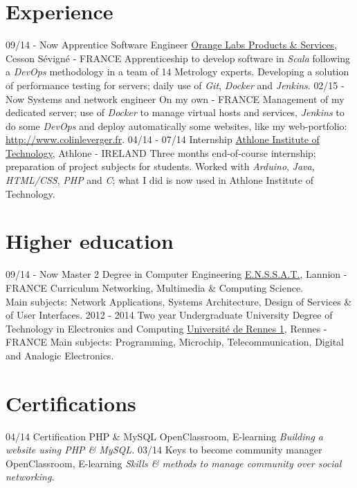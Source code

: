 \documentclass[]{friggeri-cv}
\begin{document}
\section{Experience}
\begin{entrylist}
  \entry
    {09/14 - Now}
    {Apprentice Software Engineer}
    {\href{http://www.orange.com/en/home}{Orange Labs Products \& Services}, Cesson S\'evign\'e - FRANCE}
    {Apprenticeship to develop software in \emph{Scala} following a \emph{DevOps} methodology in a team of 14 Metrology experts. Developing a solution of performance testing for servers; daily use of \emph{Git}, \emph{Docker} and \emph{Jenkins}.}
  \entry
    {02/15 - Now}
    {Systems and network engineer}
    {On my own - FRANCE}
    {Management of my dedicated server; use of \emph{Docker} to manage virtual hosts and services, \emph{Jenkins} to do some \emph{DevOps} and deploy automatically some websites, like my web-portfolio: \href{http://www.colinleverger.fr}{http://www.colinleverger.fr}.}
  \entry
    {04/14 - 07/14}
    {Internship}
    {\href{http://www.ait.ie/}{Athlone Institute of Technology}, Athlone - IRELAND}
    {Three months end-of-course internship; preparation of project subjects for students. Worked with \emph{Arduino}, \emph{Java}, \emph{HTML/CSS}, \emph{PHP} and \emph{C}; what I did is now used in Athlone Institute of Technology.}
\end{entrylist}

\section{Higher education}
\begin{entrylist}
  \entry
    {09/14 - Now}
    {Master 2 Degree in Computer Engineering}
    {\href{http://www.enssat.fr}{E.N.S.S.A.T.}, Lannion - FRANCE}
    {Curriculum Networking, Multimedia \& Computing Science.\\
    Main subjects: Network Applications, Systems Architecture, Design of Services \& of User Interfaces.}
  \entry
    {2012 - 2014}
    {Two year Undergraduate University Degree of Technology in Electronics and Computing}
    {\href{https://iut-rennes.univ-rennes1.fr/les-6-departements/genie-electrique-informatique-industrielle}{Universit\'e de Rennes 1}, Rennes - FRANCE}
    {Main subjects: Programming, Microchip, Telecommunication, Digital and Analogic Electronics.}
\end{entrylist}

\section{Certifications}
\begin{entrylist}
  \entry
    {04/14}
    {Certification PHP \& MySQL}
    {OpenClassroom, E-learning}
    {\emph{Building a website using PHP \& MySQL.}}
  \entry
    {03/14}
    {Keys to become community manager}
    {OpenClassroom, E-learning}
    {\emph{Skills \& methods to manage community over social networking.}}
\end{entrylist}
\end{document}
